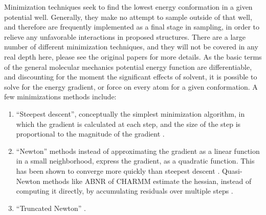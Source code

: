 Minimization techniques seek to find the lowest energy conformation in a given potential well.
Generally, they make no attempt to sample outside of that well, and therefore are frequently implemented as a final stage in sampling, in order to relieve any unfavorable interactions in proposed structures.
There are a large number of different minimization techniques, and they will not be covered in any real depth here, please see the original papers for more details.
As the basic terms of the general molecular mechanics potential energy function are differentiable, and discounting for the moment the significant effects of solvent, it is possible to solve for the energy gradient, or force on every atom for a given conformation. 
A few minimizations methods include:
\begin{enumerate}
\item ``Steepest descent'', conceptually the simplest minimization algorithm, in which the gradient is calculated at each step, and the size of the step is proportional to the magnitude of the gradient \cite{levitt1969refinement,bixon1967potential}.
\item ``Newton'' methods instead of approximating the gradient as a linear function in a small neighborhood, express the gradient, as a quadratic function.  This has been shown to converge more quickly than steepest descent \cite{ponder1987efficient}.  Quasi-Newton methods like ABNR of CHARMM estimate the hessian, instead of computing it directly, by accumulating residuals over multiple steps \cite{chu2003super}.
\item ``Truncated Newton'' \cite{}.
\end{enumerate}


